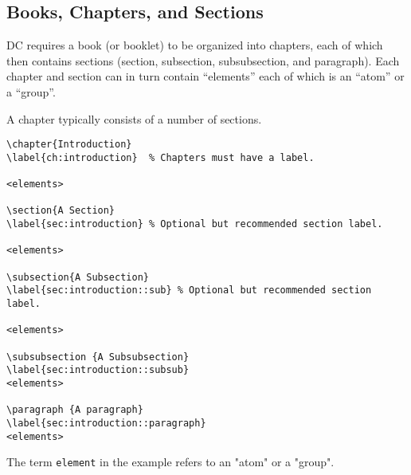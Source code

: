 \subsection{Books, Chapters, and Sections} 

DC requires a book (or booklet) to be organized into chapters, each of which then contains sections (section, subsection, subsubsection, and paragraph).  Each chapter and section can in turn contain ``elements'' each of which is an ``atom'' or a  ``group''.


\begin{example}[Sections]

A chapter typically consists of a number of sections.

\begin{lstlisting}
\chapter{Introduction}
\label{ch:introduction}  % Chapters must have a label.
   
<elements>

\section{A Section}
\label{sec:introduction} % Optional but recommended section label.   

<elements>

\subsection{A Subsection}
\label{sec:introduction::sub} % Optional but recommended section label.   

<elements>

\subsubsection {A Subsubsection}
\label{sec:introduction::subsub}
<elements>

\paragraph {A paragraph}
\label{sec:introduction::paragraph}
<elements>

\end{lstlisting}

The term \lstinline`element` in the example refers to an "atom" or a "group".
\end{example}



